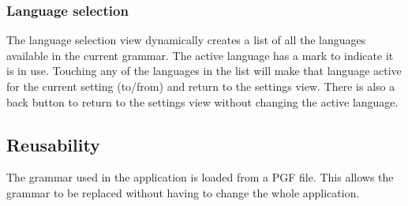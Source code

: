 \subsubsection{Language selection}
The language selection view dynamically creates a list of all the languages available in the current grammar. The active language has a mark to indicate it is in use. Touching any of the languages in the list will make that language active for the current setting (to/from) and return to the settings view. There is also a back button to return to the settings view without changing the active language.


\subsection{Reusability}
The grammar used in the application is loaded from a PGF file. This allows the grammar to be replaced without having to change the whole application.
